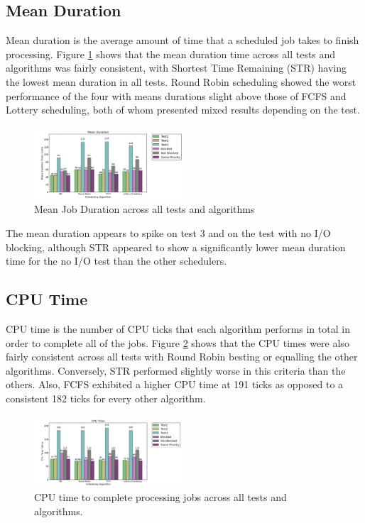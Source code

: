 \documentclass{acm_proc_article-sp}
\begin{document}
\subsection{Mean Duration}
Mean duration is the average amount of time that a scheduled job takes to finish processing. Figure \ref{fig:duration} shows that the mean duration time across all tests and algorithms was fairly consistent, with Shortest Time Remaining (STR) having the lowest mean duration in all tests. Round Robin scheduling showed the worst performance of the four with means durations slight above those of FCFS and Lottery scheduling, both of whom presented mixed results depending on the test.

\begin{figure}[H]
\centering
\includegraphics[width=0.5\textwidth]{duration.png}
\caption{Mean Job Duration across all tests and algorithms}
\label{fig:duration}
\end{figure}

The mean duration appears to spike on test 3 and on the test with no I/O blocking, although STR appeared to show a significantly lower mean duration time for the no I/O test than the other schedulers.

\subsection{CPU Time}
CPU time is the number of CPU ticks that each algorithm performs in total in order to complete all of the jobs. Figure \ref{fig:cpu-time} shows that the CPU times were also fairly consistent across all tests with Round Robin besting or equalling the other algorithms. Conversely, STR performed slightly worse in this criteria than the others. Also, FCFS exhibited a higher CPU time at 191 ticks as opposed to a consistent 182 ticks for every other algorithm. 

\begin{figure}[H]
\centering
\includegraphics[width=0.5\textwidth]{cpu_time.png}
\caption{CPU time to complete processing jobs across all tests and algorithms.}
\label{fig:cpu-time}
\end{figure}
\end{document}
